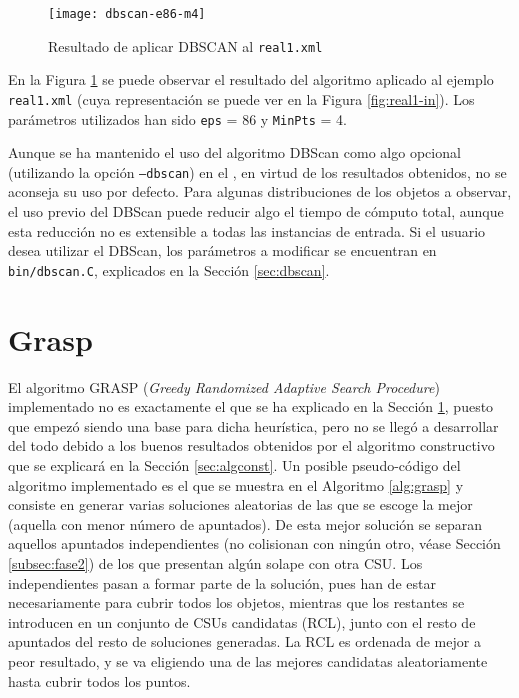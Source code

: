 \begin{figure}[!htb]
\centering
\texttt{[image: dbscan-e86-m4]}
\caption{Resultado de aplicar DBSCAN al \texttt{real1.xml}}
\label{fig:dbscan-e86-m4}
\end{figure}

En la Figura \ref{fig:dbscan-e86-m4} se puede observar el resultado del
algoritmo aplicado al ejemplo \texttt{real1.xml} (cuya representación se puede
ver en la Figura \ref{fig:real1-in}). Los parámetros utilizados han sido 
\texttt{eps} = 86 y \texttt{MinPts} = 4.

Aunque se ha mantenido el uso del algoritmo DBScan como algo opcional
(utilizando la opción \texttt{--dbscan}) en el \CSUO{}, en virtud de los resultados obtenidos,
no se aconseja su uso por defecto.
Para algunas distribuciones de los objetos a observar, el uso previo del DBScan puede reducir algo
el tiempo de cómputo total, aunque esta reducción no es extensible a todas las instancias de entrada.
Si el usuario desea utilizar el DBScan, los parámetros a
modificar se encuentran en \texttt{bin/dbscan.C}, explicados en la Sección
\ref{sec:dbscan}.

\section{Grasp} \label{sec:grasp}

El algoritmo GRASP (\textit{Greedy Randomized Adaptive Search Procedure})
implementado no es exactamente el que se ha explicado en la Sección \ref{sec:grasp}, puesto que
empezó siendo una base para dicha heurística, pero no se llegó a desarrollar del
todo debido a los buenos resultados obtenidos por el algoritmo constructivo que
se explicará en la Sección \ref{sec:algconst}.  
Un posible pseudo-código del
algoritmo implementado es el que se muestra en el Algoritmo \ref{alg:grasp} y
consiste en generar varias soluciones aleatorias de las que se escoge la mejor
(aquella con menor número de apuntados). De esta mejor solución se separan
aquellos apuntados independientes (no colisionan con ningún otro, véase Sección
\ref{subsec:fase2}) de los que presentan algún solape con otra CSU. Los
independientes pasan a formar parte de la solución, pues han de estar
necesariamente para cubrir todos los objetos, mientras que los restantes se
introducen en un conjunto de CSUs candidatas (RCL), junto con el resto de
apuntados del resto de soluciones generadas. La RCL es ordenada de mejor a peor
resultado, y se va eligiendo una de las mejores candidatas aleatoriamente hasta
cubrir todos los puntos. 

